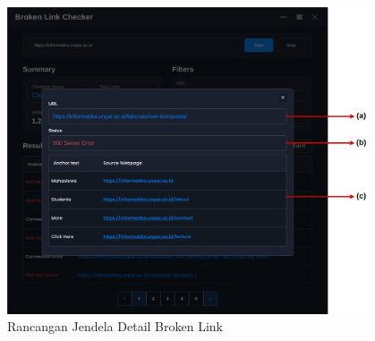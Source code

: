 \begin{enumerate}
    \begin{figure}[H]
        \centering
        \includegraphics[width=0.95\textwidth]{Gambar/040302-jendela-detail-broken-link.png}
        \caption{Rancangan Jendela Detail Broken Link}
        \label{fig:rancangan-jendela-detail-broken-link}
    \end{figure}

\end{enumerate}
